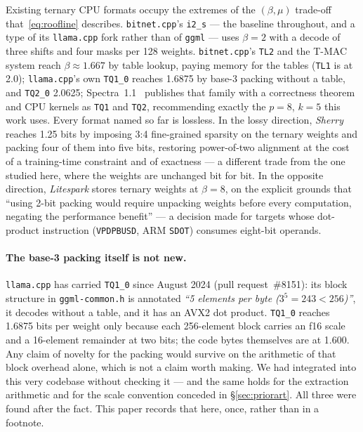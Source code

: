 \documentclass[11pt,a4paper]{article}
\newcommand{\code}[1]{\texttt{#1}}
\begin{document}
Existing ternary CPU formats occupy the extremes of the $(\beta,\mu)$ trade-off
that~\eqref{eq:roofline} describes. \code{bitnet.cpp}'s \code{i2\_s} --- the
baseline throughout, and a type of its \code{llama.cpp} fork rather than of
\code{ggml} --- uses
$\beta=2$ with a decode of three shifts and four masks per 128 weights.
\code{bitnet.cpp}'s \code{TL2} and the T-MAC system reach
$\beta\approx\num{1.667}$ by table lookup, paying memory for the tables
(\code{TL1} is at \num{2.0}); \code{llama.cpp}'s own \code{TQ1\_0} reaches
\num{1.6875} by base-3 packing without a table, and \code{TQ2\_0}
\num{2.0625}; Spectra~1.1~\cite{spectra} publishes that family with a
correctness theorem and CPU kernels as \code{TQ1} and \code{TQ2}, recommending
exactly the $p=8$, $k=5$ this work uses. Every format named so far is lossless.
In the lossy direction, \emph{Sherry}~\cite{sherry} reaches \num{1.25} bits by
imposing 3:4 fine-grained sparsity on the ternary weights and packing four of
them into five bits, restoring power-of-two alignment at the cost of a
training-time constraint and of exactness --- a different trade from the one
studied here, where the weights are unchanged bit for bit. In the
opposite direction, \emph{Litespark} stores ternary weights at $\beta=8$, on the
explicit grounds that ``using 2-bit packing would require unpacking weights
before every computation, negating the performance benefit'' --- a decision made
for targets whose dot-product instruction (\code{VPDPBUSD}, ARM \code{SDOT})
consumes eight-bit operands.

\paragraph{The base-3 packing itself is not new.} \code{llama.cpp} has carried \code{TQ1\_0} since August
2024 (pull request~\#8151): its block structure in \code{ggml-common.h} is
annotated \emph{``5 elements per byte ($3^5 = 243 < 256$)''}, it decodes without
a table, and it has an AVX2 dot product. \code{TQ1\_0} reaches \num{1.6875}
bits per weight only because each 256-element block carries an f16 scale and a
16-element remainder at two bits; the code bytes themselves are at \num{1.600}.
Any claim of novelty for the packing would survive on the arithmetic of that
block overhead alone, which is not a claim worth making. We had integrated into
this very codebase without checking it --- and the same holds for the extraction
arithmetic and for the scale convention conceded in \S\ref{sec:priorart}. All
three were found after the fact. This paper records that here, once, rather than
in a footnote.
\end{document}
